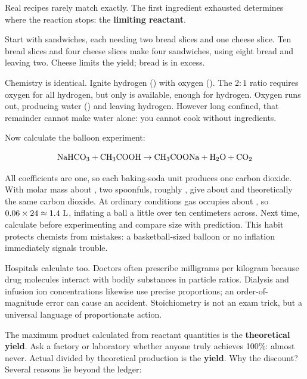 Real recipes rarely match exactly. The first ingredient exhausted determines where the reaction stops: the \textbf{limiting reactant}.

Start with sandwiches, each needing two bread slices and one cheese slice. Ten bread slices and four cheese slices make four sandwiches, using eight bread and leaving two. Cheese limits the yield; bread is in excess.

Chemistry is identical. Ignite  hydrogen () with  oxygen (). The $2:1$ ratio requires  oxygen for all hydrogen, but only  is available, enough for  hydrogen. Oxygen runs out, producing  water () and leaving  hydrogen. However long confined, that remainder cannot make water alone: you cannot cook without ingredients.

Now calculate the balloon experiment:

\[\mathrm{NaHCO_3} + \mathrm{CH_3COOH} \rightarrow \mathrm{CH_3COONa} + \mathrm{H_2O} + \mathrm{CO_2}\]

All coefficients are one, so each baking-soda unit produces one carbon dioxide. With molar mass about , two spoonfuls, roughly , give about  and theoretically the same carbon dioxide. At ordinary conditions  gas occupies about , so $0.06\times 24\approx1.4\ \mathrm{L}$, inflating a ball a little over ten centimeters across. Next time, calculate before experimenting and compare size with prediction. This habit protects chemists from mistakes: a basketball-sized balloon or no inflation immediately signals trouble.

Hospitals calculate too. Doctors often prescribe milligrams per kilogram because drug molecules interact with bodily substances in particle ratios. Dialysis and infusion ion concentrations likewise use precise proportions; an order-of-magnitude error can cause an accident. Stoichiometry is not an exam trick, but a universal language of proportionate action.

The maximum product calculated from reactant quantities is the \textbf{theoretical yield}. Ask a factory or laboratory whether anyone truly achieves 100\%: almost never. Actual divided by theoretical production is the \textbf{yield}. Why the discount? Several reasons lie beyond the ledger:

